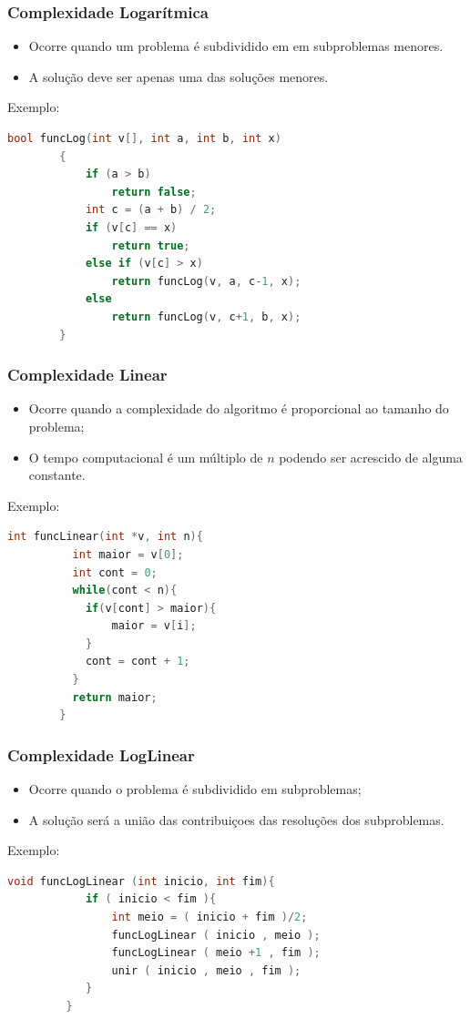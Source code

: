 \documentclass[10pt]{beamer}
\begin{document}
\begin{frame}[fragile, t]
    \frametitle{Complexidade Logarítmica}
    \begin{itemize}
        \item Ocorre quando um problema é subdividido em em subproblemas menores.
        \item A solução deve ser apenas uma das soluções menores.
    \end{itemize}
    \pause Exemplo:
    \begin{lstlisting}[language=C++, basicstyle=\small]
        bool funcLog(int v[], int a, int b, int x)
        {
            if (a > b)
                return false;
            int c = (a + b) / 2;
            if (v[c] == x)
                return true;
            else if (v[c] > x)
                return funcLog(v, a, c-1, x);
            else
                return funcLog(v, c+1, b, x);
        }
    \end{lstlisting}

\end{frame}


\begin{frame}[fragile, t]
    \frametitle{Complexidade Linear}
    \begin{itemize}
        \item Ocorre quando a complexidade do algoritmo é proporcional ao tamanho do problema;
        \item O tempo computacional é um múltiplo de $n$ podendo ser acrescido de alguma constante.
    \end{itemize}
    \pause Exemplo:
    \begin{lstlisting}[language=C++, basicstyle=\small]
        int funcLinear(int *v, int n){ 
          int maior = v[0];
          int cont = 0;
          while(cont < n){
            if(v[cont] > maior){
                maior = v[i];
            }
            cont = cont + 1;
          }
          return maior;
        } 
    \end{lstlisting}

\end{frame}

\begin{frame}[fragile, t]
    \frametitle{Complexidade LogLinear}
    \begin{itemize}
        \item Ocorre quando o problema é subdividido em subproblemas;
        \item A solução será a união das contribuiçoes das resoluções dos subproblemas.
    \end{itemize}
    \pause Exemplo:
    \begin{lstlisting}[language=C++, basicstyle=\small]
        void funcLogLinear (int inicio, int fim){
            if ( inicio < fim ){
                int meio = ( inicio + fim )/2;
                funcLogLinear ( inicio , meio );
                funcLogLinear ( meio +1 , fim );
                unir ( inicio , meio , fim );
            }
         }
    \end{lstlisting}

\end{frame}
\end{document}
